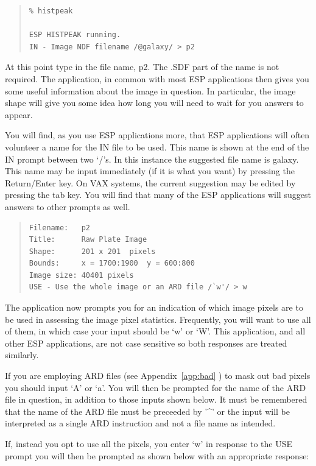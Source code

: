 \documentclass[twoside,11pt]{article}
\newenvironment{myquote}{\begin{quote}\begin{small}}{\end{small}\end{quote}}
\begin{document}
\begin{myquote}
\begin{verbatim}
% histpeak

ESP HISTPEAK running.
IN - Image NDF filename /@galaxy/ > p2
\end{verbatim}
\end{myquote}

At this point type in the file name, p2. The .SDF part of the name is
not required. The application, in common with most ESP applications
then gives you some useful information about the image in question.
In particular, the image shape will give you some idea how long you will
need to wait for you answers to appear.

You will find, as you use ESP applications more, that ESP applications will
often volunteer a name for the IN file to be used. This name is shown at the
end of the IN  prompt between two `/'s. In this instance the suggested file
name is galaxy. This name may be input
immediately (if it is what you want) by pressing the Return/Enter
key. On VAX systems, the current suggestion may be edited by pressing the tab
key. You will find that many of the ESP applications will suggest answers to
other prompts as well.

\begin{myquote}
\begin{verbatim}
Filename:   p2
Title:      Raw Plate Image
Shape:      201 x 201  pixels
Bounds:     x = 1700:1900  y = 600:800
Image size: 40401 pixels
USE - Use the whole image or an ARD file /`w'/ > w
\end{verbatim}
\end{myquote}

The application now prompts you for an indication of which image pixels are
to be used in assessing the image pixel statistics. Frequently, you
will want to use all of
them, in which case your input should be `w' or `W'. This application,
and all other ESP applications,
are not case sensitive so both responses are treated similarly.

If you are employing ARD files (see Appendix~\ref{app:bad} ) to mask out bad
pixels you should input `A' or `a'.
You will then be
prompted for the name of the ARD file in question, in addition to those
inputs shown below. It must be remembered that the name of the ARD file
must be preceeded by '\^{ }' or the input will be interpreted as a single
ARD instruction and
not a file name as intended.

If, instead you opt to use all the pixels, you enter `w' in response to the
USE prompt you will then be prompted as shown below with an appropriate
response:
\end{document}
